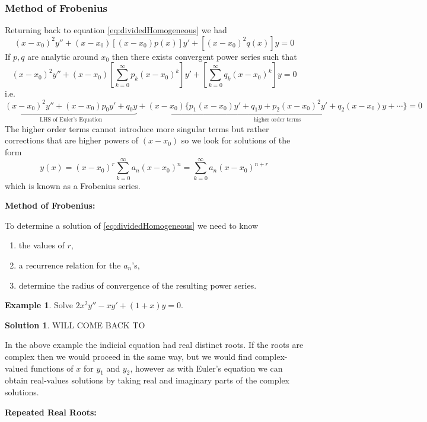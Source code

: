 \documentclass{article}
\theoremstyle{plain}
\theoremstyle{definition}
\newtheorem{exmp}{Example}[section]
\newtheorem*{sol}{Solution}
\numberwithin{equation}{section}
\begin{document}
\subsubsection{Method of Frobenius}

Returning back to equation \eqref{eq:dividedHomogeneous} we had
\[
(x-x_0)^2y'' + (x-x_0)\left[ (x-x_0)p(x)\right]y' + \left[ (x-x_0)^2q(x)\right]y = 0
\]
If $p,q$ are analytic around $x_0$ then there exists convergent power series such that
\[
(x-x_0)^2y'' + (x-x_0)\left[\sum_{k=0}^{\infty}p_k(x-x_0)^k \right]y' + \left[ \sum_{k=0}^{\infty}q_k(x-x_0)^k\right]y = 0
\]
i.e.
\[
\underbrace{(x-x_0)^2y'' + (x-x_0)p_0y' + q_0y}_{\text{LHS of Euler's Equation}} + \underbrace{(x-x_0)\Big\{ p_1(x-x_0)y' + q_1y + p_2(x-x_0)^2y' + q_2(x-x_0)y + \cdots \Big\}}_{\text{higher order terms}} = 0
\]
The higher order terms cannot introduce more singular terms but rather corrections that are higher powers of $(x-x_0)$ so we look for solutions of the form
\[
y(x) = (x-x_0)^r\sum_{k=0}^{\infty} a_n(x-x_0)^n = \sum_{k=0}^{\infty} a_n(x-x_0)^{n+r}
\]
which is known as a Frobenius series.

\textbf{Method of Frobenius:}

To determine a solution of \eqref{eq:dividedHomogeneous} we need to know
\begin{enumerate}[1)]
    \item the values of $r$,
    \item a recurrence relation for the $a_n$'s,
    \item determine the radius of convergence of the resulting power series.
\end{enumerate}

\begin{tcolorbox}
    \begin{exmp}
        Solve $2x^2y'' - xy' + (1+x)y = 0$.
    \end{exmp}
    \begin{sol}
        WILL COME BACK TO
    \end{sol}
\end{tcolorbox}

In the above example the indicial equation had real distinct roots. If the roots are complex then we would proceed in the same way, but we would find complex-valued functions of $x$ for $y_1$ and $y_2$, however as with Euler's equation we can obtain real-values solutions by taking real and imaginary parts of the complex solutions.

\textbf{Repeated Real Roots:}
\end{document}
